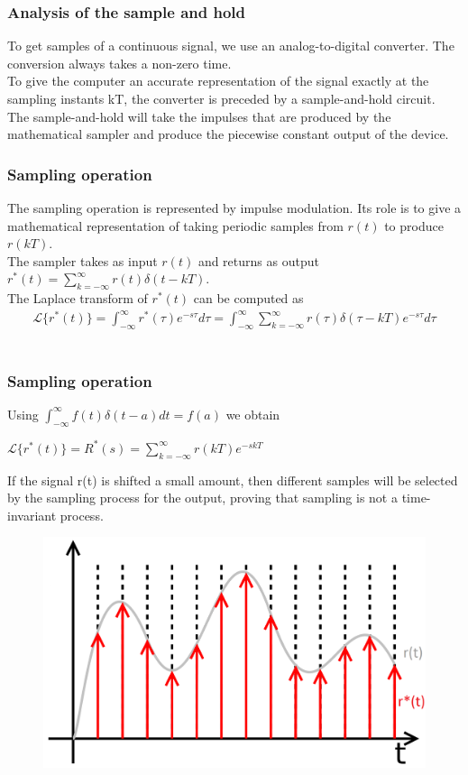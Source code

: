 \begin{frame}
	\frametitle{Analysis of the sample and hold}
	\vspace{-6ex}
	To get samples of a continuous signal, we use an analog-to-digital converter. The conversion always takes a non-zero time.\\
	\medskip
	To give the computer an accurate representation of the signal exactly at the sampling instants kT, the converter is preceded by a sample-and-hold circuit.\\
	The sample-and-hold will take the impulses that are produced by the mathematical sampler and produce the piecewise constant output of the device.
\end{frame}

\begin{frame}
	\frametitle{Sampling operation}
	\vspace{-4ex}
	The sampling operation is represented by impulse modulation. Its role is to give a mathematical representation of taking periodic samples from $r(t)$ to produce $r(kT)$. \\
	\medskip
	The sampler takes as input $r(t)$ and returns as output
	\bigskip
	$r^*(t)=\sum_{k=-\infty}^{\infty} r(t)\delta(t-kT)$.\\
	The Laplace transform of $r^*(t)$ can be computed as\\
	\vspace{-2ex} 
	\begin{align*} 
	\mathcal{L}\{r^*(t)\} = \int_{-\infty}^{\infty} r^*(\tau)e^{-s\tau} d\tau = \int_{-\infty}^{\infty} \sum_{k=-\infty}^{\infty} r(\tau)\delta(\tau-kT)e^{-s\tau}d\tau 
	\end{align*}\\
\end{frame}

\begin{frame}
	\frametitle{Sampling operation}
	Using $\int_{-\infty}^{\infty} f(t)\delta(t-a)dt = f(a)$ we obtain \\ 
	\begin{center}
		$\mathcal{L}\{r^*(t)\} = R^*(s) = \sum_{k=-\infty}^{\infty} r(kT)e^{-skT}$
	\end{center}
	If the signal r(t) is shifted a small amount, then different samples will be selected by the sampling process for the output, proving that sampling is not a time-invariant process.
	\begin{figure}
		\includegraphics[width=0.57\linewidth]{sampled_signal}
	\end{figure}
\end{frame}

